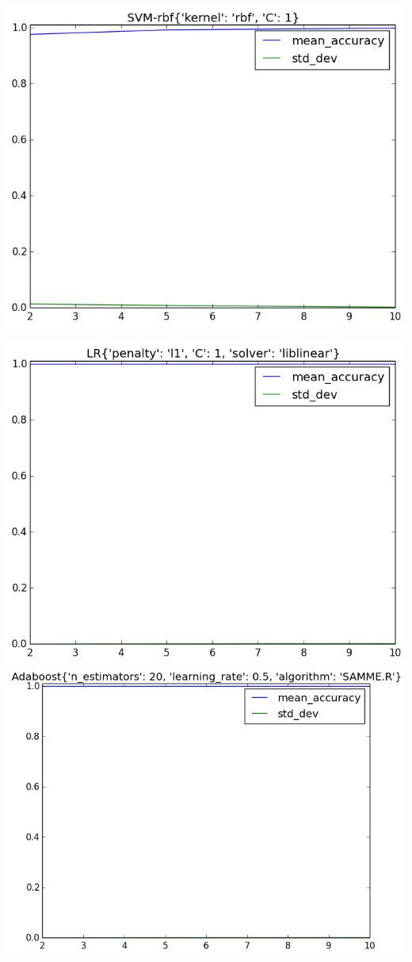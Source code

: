 \documentclass[fleqn]{article}
\begin{document}
\begin{center}
        \includegraphics[scale=0.3]{model_accuracy_vs_folds_SVM-rbf.png}
    \end{center}
    \begin{center}
        \includegraphics[scale=0.3]{model_accuracy_vs_folds_LR.png}
        \includegraphics[scale=0.3]{model_accuracy_vs_folds_AdaBoost.png}
    \end{center}
\end{document}
